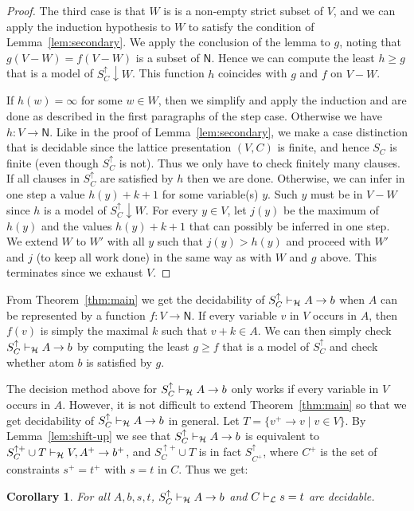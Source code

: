 \documentclass[11pt,a4paper]{article}
\newtheorem{corollary}[theorem]{Corollary}
\newcommand{\N}{\mathsf{N}}
\newcommand\set[1]{\{#1\}}
\newcommand\lathy{{\cal L}}
\newcommand\prvL{\vdash_{\lathy}}
\newcommand\prvH{\vdash_{\cal H}}
\begin{document}
\begin{proof}
The third case is that $W$ is is a non-empty strict 
subset of $V$, and we can apply the induction
hypothesis to $W$ to satisfy the condition of 
Lemma~\ref{lem:secondary}. We apply the conclusion of 
the lemma to $g$, noting that $g(V-W)=f(V-W)$ is
a subset of $\N$. Hence we can compute the least 
$h\geq g$ that is a model of $S^\uparrow_C{\downarrow}W$.
This function $h$ coincides with $g$ and $f$ on $V-W$. 

If $h(w) = \infty$ for some $w\in W$, 
then we simplify and apply the induction and are done 
as described in the first paragraphs of the step case.
Otherwise we have $h: V\to\N$.
Like in the proof of Lemma~\ref{lem:secondary},
we make a case distinction that is decidable since
the lattice presentation $(V,C)$ is finite,
and hence $S_C$ is finite (even though $S^\uparrow_C$ is not).
Thus we only have to check finitely many clauses.
If all clauses in $S^\uparrow_C$ are satisfied by $h$ then we are done.
Otherwise, we can infer in one step a value $h(y)+k+1$ 
for some variable(s) $y$. Such $y$ must be in $V-W$ 
since $h$ is a model of $S^\uparrow_C{\downarrow}W$.
For every $y\in V$, let $j(y)$ be the maximum of $h(y)$
and the values $h(y)+k+1$ that can possibly
be inferred in one step.
We extend $W$ to $W'$ with all $y$ such that $j(y)>h(y)$ 
and proceed with $W'$ and $j$ (to keep all work done)
in the same way as with $W$ and $g$ above.
This terminates since we exhaust $V$.
\end{proof}


From Theorem~\ref{thm:main} we get the decidability of $S^\uparrow_C\prvH A\to b$
when $A$ can be represented by a function $f: V\to\N$. If every
variable $v$ in $V$ occurs in $A$, then $f(v)$ is simply
the maximal $k$ such that $v+k \in A$. We can then simply check
$S^\uparrow_C\prvH A\to b$ by computing the least $g\geq f$ that is
a model of $S^\uparrow_C$ and check whether atom $b$ is satisfied by $g$.

The decision method above for $S^\uparrow_C\prvH A\to b$ only works
if every variable in $V$ occurs in $A$.
However, it is not difficult to extend Theorem~\ref{thm:main}
so that we get decidability of $S^\uparrow_C\prvH A\to b$ in general. 
Let $T=\set{v^+\to v \mid v\in V}$. By Lemma~\ref{lem:shift-up}
we see that $S^\uparrow_C\prvH A\to b$ is equivalent to
$S^{\uparrow+}_C \cup T \prvH V,A^+ \to b^+$, and
$S^{\uparrow+}_C \cup T$ is in fact $S^{\uparrow}_{C^+}$, where
$C^+$ is the set of constraints $s^+ = t^+$ with $s=t$ in $C$.
 Thus we get:

\begin{corollary}\label{cor:decidability}
For all $A,b,s,t$, $S^\uparrow_C\prvH A\to b$ and $C\prvL s=t$ are decidable.
\end{corollary}
\end{document}
